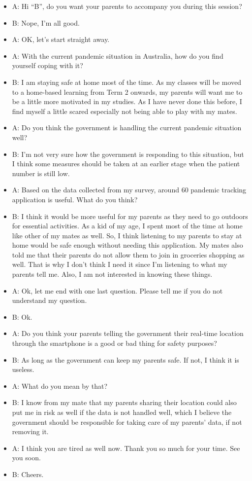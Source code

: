 \begin{appendices}
      \begin{itemize}
        \item A: Hi “B”, do you want your parents to accompany you during this session?
        \item B: Nope, I’m all good.
        \item A: OK, let’s start straight away.
        \item A: With the current pandemic situation in Australia, how do you find yourself coping with it?
        \item B: I am staying safe at home most of the time. As my classes will be moved to a home-based
  learning from Term 2 onwards, my parents will want me to be a little more motivated in my
  studies. As I have never done this before, I find myself a little scared especially not being able to
  play with my mates.
        \item A: Do you think the government is handling the current pandemic situation well?
        \item B: I’m not very sure how the government is responding to this situation, but I think some
  measures should be taken at an earlier stage when the patient number is still low.
        \item A: Based on the data collected from my survey, around 60%
  pandemic tracking application is useful. What do you think?
        \item B: I think it would be more useful for my parents as they need to go outdoors for essential
  activities. As a kid of my age, I spent most of the time at home like other of my mates as well. So,
  I think listening to my parents to stay at home would be safe enough without needing this
  application. My mates also told me that their parents do not allow them to join in groceries
  shopping as well. That is why I don’t think I need it since I’m listening to what my parents
  tell me. Also, I am not interested in knowing these things.
        \item A: Ok, let me end with one last question. Please tell me if you do not understand my question.
        \item B: Ok.
        \item A: Do you think your parents telling the government their real-time location through the
  smartphone is a good or bad thing for safety purposes?
        \item B: As long as the government can keep my parents safe. If not, I think it is useless.
        \item A: What do you mean by that?
        \item B: I know from my mate that my parents sharing their location could also put me in risk as well
  if the data is not handled well, which I believe the government should be responsible for taking
  care of my parents' data, if not removing it.
        \item A: I think you are tired as well now. Thank you so much for your time. See you soon.
        \item B: Cheers.
      \end{itemize}


\end{appendices}
